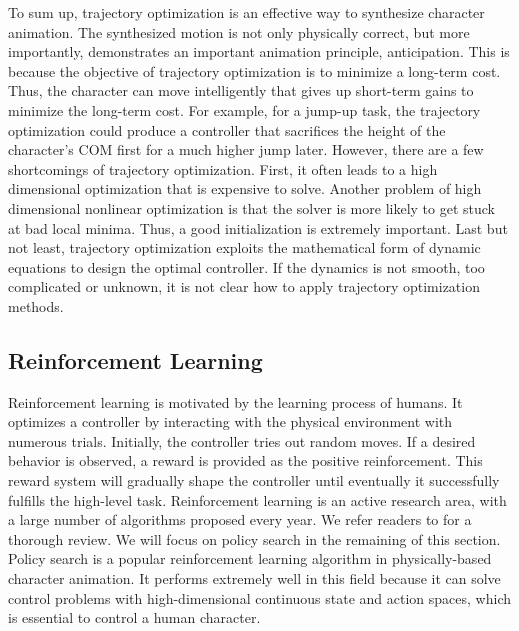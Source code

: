 To sum up, trajectory optimization is an effective way to synthesize character animation. The synthesized motion is not only physically correct, but more importantly, demonstrates an important animation principle, anticipation. This is because the objective of trajectory optimization is to minimize a long-term cost. Thus, the character can move intelligently that gives up short-term gains to minimize the long-term cost. For example, for a jump-up task, the trajectory optimization could produce a controller that sacrifices the height of the character's COM first for a much higher jump later. However, there are a few shortcomings of trajectory optimization. First, it often leads to a high dimensional optimization that is expensive to solve. Another problem of high dimensional nonlinear optimization is that the solver is more likely to get stuck at bad local minima. Thus, a good initialization is extremely important. Last but not least, trajectory optimization exploits the mathematical form of dynamic equations to design the optimal controller. If the dynamics is not smooth, too complicated or unknown, it is not clear how to apply trajectory optimization methods.


\subsection{Reinforcement Learning}
Reinforcement learning is motivated by the learning process of humans. It optimizes a controller by interacting with the physical environment with numerous trials. Initially, the controller tries out random moves. If a desired behavior is observed, a reward is provided as the positive reinforcement. This reward system will gradually shape the controller until eventually it successfully fulfills the high-level task. Reinforcement learning is an active research area, with a large number of algorithms proposed every year. We refer readers to \cite{Kaelbling1996,Bagnell:2013} for a thorough review. We will focus on policy search in the remaining of this section. Policy search is a popular reinforcement learning algorithm in physically-based character animation. It performs extremely well in this field because it can solve control problems with high-dimensional continuous state and action spaces, which is essential to control a human character. 

